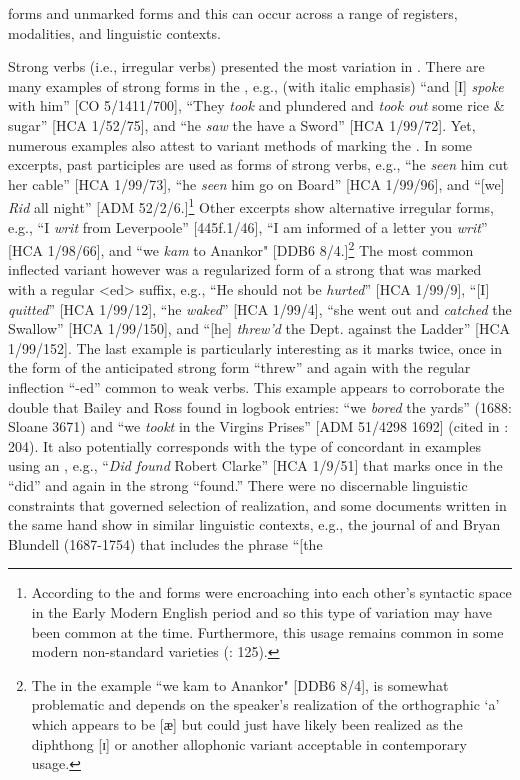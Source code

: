  forms and unmarked  forms and this can occur across a range of registers, modalities, and linguistic contexts. 

Strong verbs (i.e., irregular verbs) presented the most variation in . There are many examples of strong  forms in the , e.g., (with italic emphasis) “and [I] \textit{spoke} with him” [CO 5/1411/700], “They \textit{took} and plundered and \textit{took out} some rice \& sugar” [HCA 1/52/75], and “he \textit{saw} the  have a Sword” [HCA 1/99/72]. Yet, numerous examples also attest to variant methods of marking the . In some excerpts, past participles are used as  forms of strong verbs, e.g., “he \textit{seen} him cut her cable” [HCA 1/99/73], “he \textit{seen} him go on Board” [HCA 1/99/96], and “[we] \textit{Rid} all night” [ADM 52/2/6.]\footnote{According to \citet[95]{Blake2002} the  and  forms were encroaching into each other’s syntactic space in the Early Modern English period and so this type of variation may have been common at the time. Furthermore, this usage remains common in some modern non-standard varieties (\citealt{Cheshire1994}: 125).} Other excerpts show alternative irregular  forms, e.g., “I \textit{writ} from Leverpoole” [445f.1/46], “I am informed of a letter you \textit{writ}” [HCA 1/98/66], and “we \textit{kam} to Anankor" [DDB6 8/4.]\footnote{The  in the example “we kam to Anankor" [DDB6 8/4], is somewhat problematic and depends on the speaker’s realization of the orthographic ‘a’ which appears to be [{ӕ] but could just have likely been realized as the diphthong [{ɪ}] or another allophonic variant acceptable in contemporary usage.} } The most common inflected variant however was a regularized form of a strong  that was marked with a regular <ed> suffix, e.g., “He should not be \textit{hurted}” [HCA 1/99/9], “[I] \textit{quitted}” [HCA 1/99/12], “he \textit{waked}” [HCA 1/99/4], “she went out and \textit{catched} the Swallow” [HCA 1/99/150], and “[he] \textit{threw’d} the Dept. against the Ladder” [HCA 1/99/152]. The last example is particularly interesting as it marks  twice, once in the form of the anticipated strong  form “threw” and again with the regular inflection “-ed” common to weak verbs. This example appears to corroborate the double  that Bailey and Ross found in logbook entries: “we \textit{bored} the yards” (1688: Sloane 3671) and “we \textit{tookt} in the Virgins Prises” [ADM 51/4298 1692] (cited in \citealt{BaileyRoss1988}: 204). It also potentially corresponds with the type of concordant  in examples using an , e.g., “\textit{Did found} Robert Clarke” [HCA 1/9/51] that marks  once in the  “did” and again in the strong  “found.” There were no discernable linguistic constraints that governed selection of  realization, and some documents written in the same hand show  in similar linguistic contexts, e.g., the journal of  and  Bryan Blundell (1687-1754) that includes the phrase “[the 